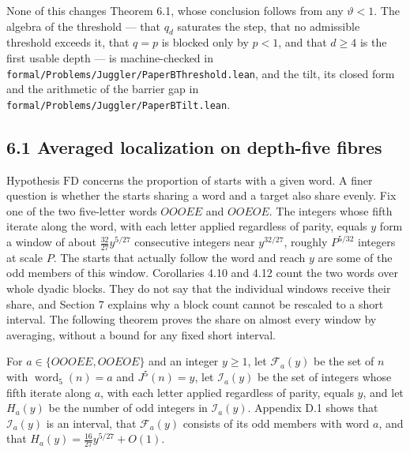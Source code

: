 \documentclass[11pt,a4paper]{article}
\begin{document}
None of this changes Theorem 6.1, whose conclusion follows from any
\(\vartheta<1\). The algebra of the threshold --- that \(q_d\) saturates
the step, that no admissible threshold exceeds it, that \(q=p\) is
blocked only by \(p<1\), and that \(d\ge4\) is the first usable depth
--- is machine-checked in
\texttt{formal/Problems/Juggler/PaperBThreshold.lean}, and the tilt, its
closed form and the arithmetic of the barrier gap in
\texttt{formal/Problems/Juggler/PaperBTilt.lean}.

\subsection{6.1 Averaged localization on depth-five
fibres}\label{averaged-localization-on-depth-five-fibres}

Hypothesis \(\mathrm{FD}\) concerns the proportion of starts with a
given word. A finer question is whether the starts sharing a word and a
target also share evenly. Fix one of the two five-letter words \(OOOEE\)
and \(OOEOE\). The integers whose fifth iterate along the word, with
each letter applied regardless of parity, equals \(y\) form a window of
about \(\tfrac{32}{27}y^{5/27}\) consecutive integers near
\(y^{32/27}\), roughly \(P^{5/32}\) integers at scale \(P\). The starts
that actually follow the word and reach \(y\) are some of the odd
members of this window. Corollaries 4.10 and 4.12 count the two words
over whole dyadic blocks. They do not say that the individual windows
receive their share, and Section 7 explains why a block count cannot be
rescaled to a short interval. The following theorem proves the share on
almost every window by averaging, without a bound for any fixed short
interval.

For \(a\in\{OOOEE,OOEOE\}\) and an integer \(y\ge1\), let
\(\mathcal F_a(y)\) be the set of \(n\) with
\(\operatorname{word}_5(n)=a\) and \(J^5(n)=y\), let \(\mathcal I_a(y)\)
be the set of integers whose fifth iterate along \(a\), with each letter
applied regardless of parity, equals \(y\), and let \(H_a(y)\) be the
number of odd integers in \(\mathcal I_a(y)\). Appendix D.1 shows that
\(\mathcal I_a(y)\) is an interval, that \(\mathcal F_a(y)\) consists of
its odd members with word \(a\), and that
\(H_a(y)=\tfrac{16}{27}y^{5/27}+O(1)\).

\end{document}
